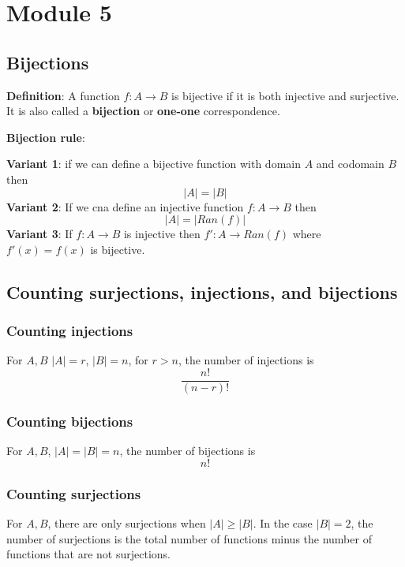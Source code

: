 \chapter{Module 5}


\section{Bijections}

\begin{framed}
   \textbf{Definition}: A function $f: A \rightarrow B$ is bijective if it is both injective and surjective. It is also called a \textbf{bijection} or \textbf{one-one} correspondence. 
\end{framed}

\begin{framed}
   \textbf{Bijection rule}: 

   \textbf{Variant 1}: if we can define a bijective function with domain $A$ and codomain $B$ then
   \[
     |A| = |B|
   \] 
   \textbf{Variant 2}: If we cna define an injective function $f: A \rightarrow B$ then
   \[
     |A| = |Ran(f)|
   \] 
   \textbf{Variant 3}: If $f: A \rightarrow B$ is injective then $f': A \rightarrow Ran(f)$ where $f'(x) = f(x)$ is bijective.
\end{framed}


\section{Counting surjections, injections, and bijections}

\subsection{Counting injections}
For $A, B$ $|A| = r$, $|B| = n$, for  $r > n$, the number of injections is
 \[
  \frac{n!}{(n-r)!}
\] 

\subsection{Counting bijections}

For $A, B$, $|A|  = |B| = n$, the number of bijections is
\[
  n!
\] 

\subsection{Counting surjections}

For $A, B$, there are only surjections when $|A| \geq |B|$. In the case $|B| = 2$, the number of surjections is the total number of functions minus the number of functions that are not surjections. \\

